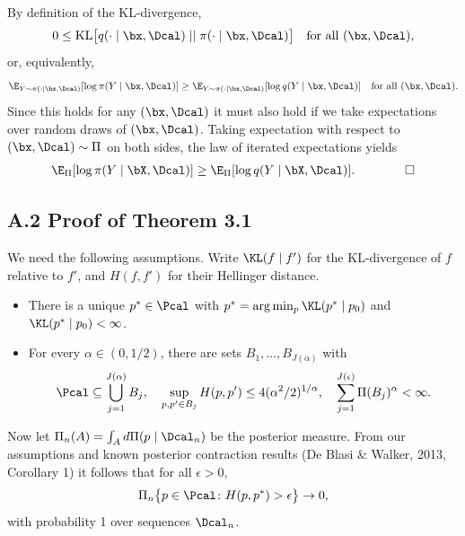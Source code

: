 \documentclass[aspectratio=169,10pt]{beamer}
\newcommand{\currentheading}{\ifx\insertsubsection\empty\insertsection\else\insertsubsection\fi}
\begin{document}
\begin{frame}{\currentheading}
\small
By definition of the KL-divergence,
\begin{align*}
	0 \le \mathrm{KL}\bigl[q(\cdot \mid \bx, \Dcal)  \;||\; \pi(\cdot \mid \bx, \Dcal) \bigr] \quad \text{for all } (\bx, \Dcal),
\end{align*}
or, equivalently,
\begin{align*}
	\E_{Y \sim \pi(\cdot \mid \bx, \Dcal)}[\log \pi(Y \mid \bx, \Dcal)] \ge \E_{Y \sim \pi(\cdot \mid \bx, \Dcal)}[\log q(Y \mid \bx, \Dcal)]  \quad \text{for all } (\bx, \Dcal).
\end{align*}
Since this holds for any $(\bx, \Dcal)$ it must also hold if we take expectations over random draws of $(\bx, \Dcal)$. Taking expectation with respect to $(\bx, \Dcal) \sim \Pi$ on both sides, the law of iterated expectations yields
\begin{align*}
	\E_\Pi [\log \pi(Y \mid \bX, \Dcal)] \ge \E_\Pi [\log q(Y \mid \bX, \Dcal)]. \qquad \qedhere
\end{align*}
\end{frame}

\subsection{A.2 Proof of Theorem 3.1}

\begin{frame}{\currentheading}
We need the following assumptions. Write $\KL(f \mid f')$ for the KL-divergence of $f$ relative to $f'$, and $H(f, f')$ for their Hellinger distance.
\begin{itemize}
	\item[(A1)] There is a unique $p^* \in \Pcal$ with $p^* = \arg\min_{p} \KL(p^* \mid p_0)$ and $\KL(p^* \mid p_0) < \infty$.
	\item[(A2)] For every $\alpha \in (0, 1/2)$, there are sets $B_1, \dots, B_{J(\alpha)}$ with
	\begin{align*}
		\Pcal \subseteq \bigcup_{j = 1}^{J(\alpha)}  B_j, \quad \sup_{p, p' \in B_{j}}  H(p, p') \le 4(\alpha^2/2)^{1/\alpha}, \quad \sum_{j = 1}^{J(\epsilon)} \Pi(B_j)^\alpha < \infty.
	\end{align*}
\end{itemize}
\end{frame}

\begin{frame}{\currentheading}
Now let $\Pi_n(A) = \int_A d\Pi(p \mid \Dcal_n)$ be the posterior measure. From our assumptions and known posterior contraction results (De Blasi \& Walker, 2013, Corollary 1) it follows that for all $\epsilon > 0$,
\begin{align*}
	\Pi_n\bigl\{p \in \Pcal\colon H(p, p^*) > \epsilon\bigr\} \to 0,
\end{align*}
with probability 1 over sequences $\Dcal_n$.
\end{frame}
\end{document}
